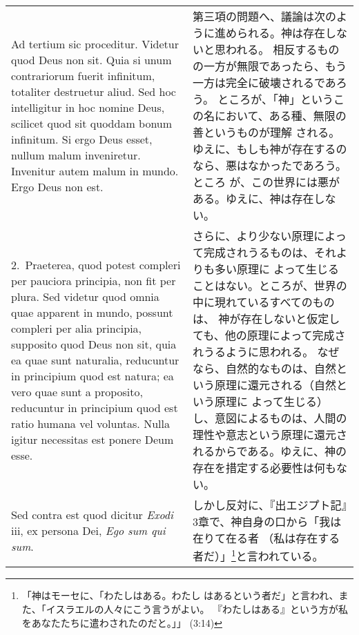 \documentclass[10pt]{jsarticle}
\begin{document}
\begin{longtable}{p{21em}p{21em}}




{\Huge A}{\sc d tertium sic proceditur}. Videtur quod Deus
non sit. Quia si unum contrariorum fuerit infinitum, totaliter
destruetur aliud. Sed hoc intelligitur in hoc nomine Deus, scilicet quod
sit quoddam bonum infinitum. Si ergo Deus esset, nullum malum
inveniretur. Invenitur autem malum in mundo. Ergo Deus non est.


&

第三項の問題へ、議論は次のように進められる。神は存在しないと思われる。
相反するものの一方が無限であったら、もう一方は完全に破壊されるであろう。
ところが、「神」というこの名において、ある種、無限の善というものが理解
される。ゆえに、もしも神が存在するのなら、悪はなかったであろう。ところ
が、この世界には悪がある。ゆえに、神は存在しない。


\\


2.~{\sc  Praeterea}, quod potest compleri per pauciora
principia, non fit per plura. Sed videtur quod omnia quae apparent in
mundo, possunt compleri per alia principia, supposito quod Deus non sit,
quia ea quae sunt naturalia, reducuntur in principium quod est natura;
ea vero quae sunt a proposito, reducuntur in principium quod est ratio
humana vel voluntas. Nulla igitur necessitas est ponere Deum esse.


&

さらに、より少ない原理によって完成されうるものは、それよりも多い原理に
よって生じることはない。ところが、世界の中に現れているすべてのものは、
神が存在しないと仮定しても、他の原理によって完成されうるように思われる。
なぜなら、自然的なものは、自然という原理に還元される（自然という原理に
よって生じる）し、意図によるものは、人間の理性や意志という原理に還元さ
れるからである。ゆえに、神の存在を措定する必要性は何もない。



\\


{\sc Sed contra est} quod dicitur {\it Exodi} {\sc iii}, ex
persona Dei, {\it Ego sum qui sum}.


&

しかし反対に、『出エジプト記』3章で、神自身の口から「我は在りて在る者
（私は存在する者だ）」\footnote{「神はモーセに、「わたしはある。わたし
はあるという者だ」と言われ、また、「イスラエルの人々にこう言うがよい。
『わたしはある』という方が私をあなたたちに遣わされたのだと。」」
(3:14)}と言われている。



\end{longtable}
\end{document}
